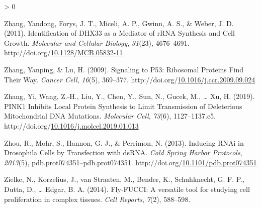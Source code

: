 \documentclass[12pt,oneside]{reedthesis}
\newlength{\cslhangindent}
\newenvironment{CSLReferences}[2] %
 {%
  \setlength{\parindent}{0pt}
  \ifodd #1 \everypar{\setlength{\hangindent}{\cslhangindent}}\ignorespaces\fi
  \ifnum #2 > 0
  \setlength{\parskip}{#2\baselineskip}
  \fi
 }%
 {}
\begin{document}
\begin{CSLReferences}{1}{0}
\leavevmode\hypertarget{ref-zhangIdentificationDHX33Mediator2011}{}%
Zhang, Yandong, Forys, J. T., Miceli, A. P., Gwinn, A. S., \& Weber, J. D. (2011). Identification of {DHX33} as a {Mediator} of {rRNA Synthesis} and {Cell Growth}. \emph{Molecular and Cellular Biology}, \emph{31}(23), 4676--4691. http://doi.org/\href{https://doi.org/10.1128/MCB.05832-11}{10.1128/MCB.05832-11}

\leavevmode\hypertarget{ref-zhangSignalingP53Ribosomal2009}{}%
Zhang, Yanping, \& Lu, H. (2009). Signaling to P53: {Ribosomal Proteins Find Their Way}. \emph{Cancer Cell}, \emph{16}(5), 369--377. http://doi.org/\href{https://doi.org/10.1016/j.ccr.2009.09.024}{10.1016/j.ccr.2009.09.024}

\leavevmode\hypertarget{ref-zhangPINK1InhibitsLocal2019}{}%
Zhang, Yi, Wang, Z.-H., Liu, Y., Chen, Y., Sun, N., Gucek, M., \ldots{} Xu, H. (2019). {PINK1 Inhibits Local Protein Synthesis} to {Limit Transmission} of {Deleterious Mitochondrial DNA Mutations}. \emph{Molecular Cell}, \emph{73}(6), 1127--1137.e5. http://doi.org/\href{https://doi.org/10.1016/j.molcel.2019.01.013}{10.1016/j.molcel.2019.01.013}

\leavevmode\hypertarget{ref-zhouInducingRNAiDrosophila2013}{}%
Zhou, R., Mohr, S., Hannon, G. J., \& Perrimon, N. (2013). Inducing {RNAi} in {Drosophila Cells} by {Transfection} with {dsRNA}. \emph{Cold Spring Harbor Protocols}, \emph{2013}(5), pdb.prot074351--pdb.prot074351. http://doi.org/\href{https://doi.org/10.1101/pdb.prot074351}{10.1101/pdb.prot074351}

\leavevmode\hypertarget{ref-Zielke2014a}{}%
Zielke, N., Korzelius, J., van Straaten, M., Bender, K., Schuhknecht, G. F. P., Dutta, D., \ldots{} Edgar, B. A. (2014). Fly-{FUCCI}: {A} versatile tool for studying cell proliferation in complex tissues. \emph{Cell Reports}, \emph{7}(2), 588--598.

\end{CSLReferences}

\end{document}
